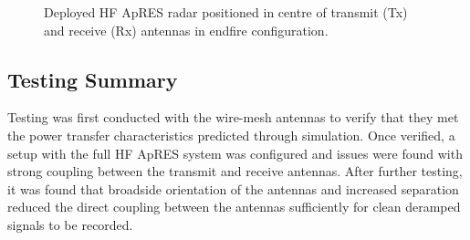 \documentclass[a4paper,12pt]{article}
\begin{document}
\begin{figure}[htbp]
  \centering
  


  \caption{
    Deployed HF ApRES radar positioned in centre of transmit (Tx) and receive
    (Rx) antennas in endfire configuration.
  }
  \label{FigHFApRESNeumayer}
\end{figure}

\subsection{Testing Summary}
Testing was first conducted with the wire-mesh antennas to verify that they 
met the power transfer characteristics predicted through simulation.  Once
verified, a setup with the full HF ApRES system was configured and issues
were found with strong coupling between the transmit and receive antennas.
After further testing, it was found that broadside orientation of the antennas
and increased separation reduced the direct coupling between the antennas 
sufficiently for clean deramped signals to be recorded.
\end{document}

